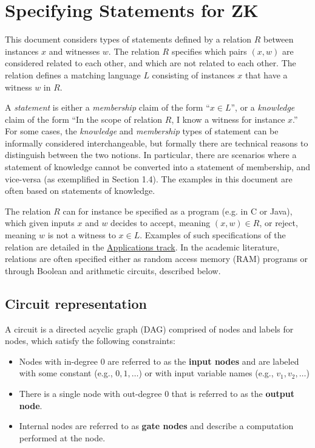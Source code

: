 \section{Specifying Statements for ZK}
\label{security:spec-statements-ZK}

 
	This document considers types of statements defined by a relation $R$ between instances $x$ and witnesses $w$.
	The relation $R$ specifies which pairs $(x,w)$ are considered related to each other, and which are not related to each other.
	The relation defines a matching language $L$ consisting of instances $x$ that have a witness $w$ in $R$.


	A \emph{statement} is either a \emph{membership} claim of the form ``$x \in L$'', 
or a \emph{knowledge} claim of the form ``In the scope of relation $R$, I know a witness for instance $x$.''
	For some cases, the \emph{knowledge} and \emph{membership} types of statement can be informally considered interchangeable, but formally there are technical reasons to distinguish between the two notions. 
	In particular, there are scenarios where a statement of knowledge cannot be converted into a statement of membership, and vice-versa (as exemplified in Section 1.4).
	The examples in this document are often based on statements of knowledge.
	\loosen

 
	The relation $R$ can for instance be specified as a program (e.g. in C or Java), which given inputs $x$ and $w$ decides to accept, meaning $(x,w) \in R$, or reject, meaning $w$ is not a witness to $x \in L$. 
	Examples of such specifications of the relation are detailed in the \hyperref[chap:apps]{Applications track}.
	In the academic literature, relations are often specified either as 
random access memory (RAM) programs or through Boolean and arithmetic circuits, described below.



\subsection{Circuit representation}
\label{security:spec-statements-ZK:circuit-representation}

A circuit is a directed acyclic graph (DAG) comprised of nodes and labels for nodes, which satisfy the following constraints:
\begin{itemize}
\item Nodes with in-degree 0 are referred to as the \textbf{input nodes} and are labeled with some constant (e.g., $0, 1, \ldots$) or with input variable names (e.g., $v_1, v_2, \ldots$)
\item There is a single node with out-degree 0 that is referred to as the \textbf{output node}.
\item Internal nodes are referred to as \textbf{gate nodes} and describe a computation performed at the node.\loosen
\end{itemize}


